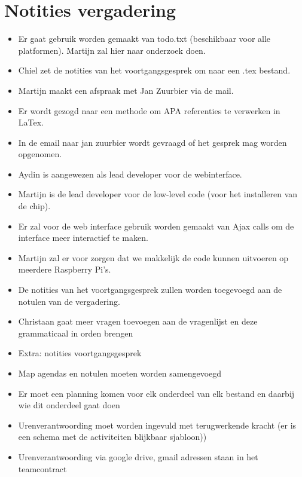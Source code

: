 \documentclass[dutch]{hu}
\begin{document}
\section{Notities vergadering}
\begin{itemize}
\item Er gaat gebruik worden gemaakt van todo.txt (beschikbaar voor alle platformen). Martijn zal hier naar onderzoek doen.

\item Chiel zet de notities van het voortgangsgesprek om naar een .tex bestand. 

\item Martijn maakt een afspraak met Jan Zuurbier via de mail. 

\item Er wordt gezogd naar een methode om APA referenties te verwerken in LaTex. 

\item In de email naar jan zuurbier wordt gevraagd of het gesprek mag worden opgenomen.

\item Aydin is aangewezen als lead developer voor de webinterface. 

\item Martijn is de lead developer voor de low-level code (voor het installeren van de chip). 

\item Er zal voor de web interface gebruik worden gemaakt van Ajax calls om de interface meer interactief te maken. 

\item Martijn zal er voor zorgen dat we makkelijk de code kunnen uitvoeren op meerdere Raspberry Pi's. 

\item De notities van het voortgangsgesprek zullen worden toegevoegd aan de notulen van de vergadering. 

\item Christaan gaat meer vragen toevoegen aan de vragenlijst en deze grammaticaal in orden brengen

\item Extra: notities voortgangsgesprek

\item Map agendas en notulen moeten worden samengevoegd

\item Er moet een planning komen voor elk onderdeel van elk bestand en daarbij wie dit onderdeel gaat doen

\item Urenverantwoording moet worden ingevuld met terugwerkende kracht (er is een schema met de activiteiten blijkbaar sjabloon))

\item Urenverantwoording via google drive, gmail adressen staan in het teamcontract 
\end{itemize}
\newpage
\end{document}
